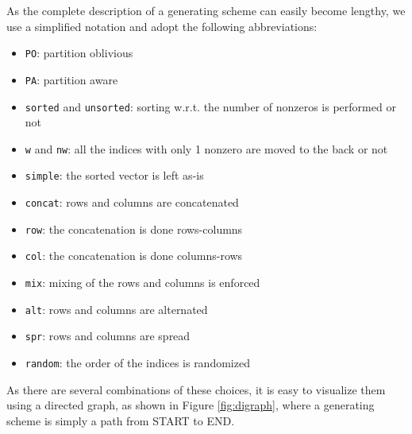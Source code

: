 As the complete description of a generating scheme can easily become lengthy, we use a simplified notation and adopt the following abbreviations:

\begin{itemize}
	\item \verb|PO|: partition oblivious
	\item \verb|PA|: partition aware
	\item \verb|sorted| and \verb|unsorted|: sorting w.r.t. the number of nonzeros is performed or not
	\item \verb|w| and \verb|nw|: all the indices with only 1 nonzero are moved to the back or not
	\item \verb|simple|: the sorted vector is left as-is
	\item \verb|concat|: rows and columns are concatenated
	\item \verb|row|: the concatenation is done rows-columns
	\item \verb|col|: the concatenation is done columns-rows
	\item \verb|mix|: mixing of the rows and columns is enforced
	\item \verb|alt|: rows and columns are alternated
	\item \verb|spr|: rows and columns are spread
	\item \verb|random|: the order of the indices is randomized
\end{itemize}

As there are several combinations of these choices, it is easy to visualize them using a directed graph, as shown in Figure \ref{fig:digraph}, where a generating scheme is simply a path from START to END. 


